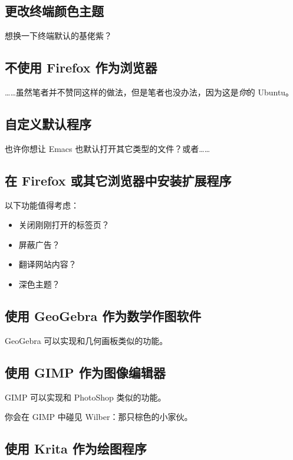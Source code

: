 \documentclass[UTF-8]{ctexart}
\begin{document}
		\subsection{更改终端颜色主题}
		
			想换一下终端默认的基佬紫？
		
		\subsection{不使用 Firefox 作为浏览器}
		
			……虽然笔者并不赞同这样的做法，但是笔者也没办法，因为这是\textit{你}的 Ubuntu。
			
		\subsection{自定义默认程序}
		
			也许你想让 Emacs 也默认打开其它类型的文件？或者……
			
		\subsection{在 Firefox 或其它浏览器中安装扩展程序}
		
			以下功能值得考虑：
			
			\begin{itemize}
				\item 关闭刚刚打开的标签页？
				\item 屏蔽广告？
				\item 翻译网站内容？
				\item 深色主题？
			\end{itemize}
			
		\subsection{使用 GeoGebra 作为数学作图软件}
		
			GeoGebra 可以实现和几何画板类似的功能。
		
		\subsection{使用 GIMP 作为图像编辑器}

			GIMP 可以实现和 PhotoShop 类似的功能。

			你会在 GIMP 中碰见 Wilber：那只棕色的小家伙。
		
		\subsection{使用 Krita 作为绘图程序}
		
\end{document}
